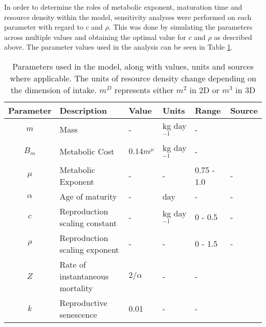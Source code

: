 \documentclass[a4paper, 11pt, hidelinks]{article} %
\begin{document}
	In order to determine the roles of metabolic exponent, maturation time and resource density within the model, sensitivity analyses were performed on each parameter with regard to $c$ and $\rho$.  This was done by simulating the parameters across multiple values and obtaining the optimal value for $c$ and $\rho$ as described above.
	The parameter values used in the analysis can be seen in Table \ref{parameters}.
	
	\begin{centering}
		
		
		\begin{table}[h!]
			
			\caption{Parameters used in the model, along with values, units and sources where applicable.  The units of resource density change depending on the dimension of intake.  $m^D$ represents either $m^2$ in 2D or $m^3$ in 3D} 
			\label{parameters}
			\vspace{2mm}
			{\RaggedRight %
			\begin{tabular}{c p{3.9cm} l l l p{3cm}}
				\hline
				Parameter 	& Description 			& Value 	& Units 	& Range 		& Source \\
				\hline
				$m$			& Mass					& -			& kg day$^{-1}$& -			&		\\
				
				$B_m$		& Metabolic Cost		& $0.14 m^{\mu}$ & kg day$^{-1}$& - 	& \cite{Peters1983}\\
				$\mu$		& Metabolic Exponent	& -			&	-		& 0.75 - 1.0	& - \\
				$\alpha$	& Age of maturity		& -     	& day		& -				& -\\
				$c$			& Reproduction scaling constant & - & kg day$^{-1}$& 0 - 0.5 		& -\\
				$\rho$		& Reproduction scaling exponent	& -	&	-		& 0 - 1.5			& -\\
				$Z$			& Rate of instantaneous mortality& $2/\alpha$	& -&-& \cite{Charnov2001}\\%
				$k$			& Reproductive senescence & 0.01	& -			& -				\\
				

\end{tabular}}
\end{table}
\end{centering}
\end{document}
